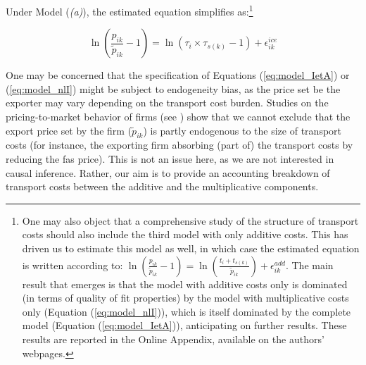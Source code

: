 \documentclass[a4paper,11pt]{article}
\begin{document}
Under Model (\textit{(a)}), the estimated equation simplifies as:\footnote{One may also object that a comprehensive study of the structure of transport costs should also include the third model with only additive costs. This has driven us to estimate this model as well, in which case the estimated equation is written according to: $\ln\left(\frac{p_{ik}}{\widetilde{p}_{ik}}-1 \right)= \ln \left(\frac{t_{i} + t_{s(k)}}{\widetilde{p}_{ik}}\right) + \epsilon^{add}_{ik}$. The main result that emerges is that the model with additive costs only is dominated (in terms of quality of fit properties) by the model with multiplicative costs only (Equation (\ref{eq:model_nlI})), which is itself dominated by the complete model (Equation (\ref{eq:model_IetA})), anticipating on further results. These results are reported in the Online Appendix, available on the authors' webpages.}

\begin{equation}
\ln\left(\frac{p_{ik}}{\widetilde{p}_{ik}}-1 \right)= \ln \left(\tau_{i}\times\tau_{s(k)}-1 \right) + \epsilon^{ice}_{ik} \label{eq:model_nlI}
\end{equation}

One may be concerned that the specification of Equations (\ref{eq:model_IetA}) or (\ref{eq:model_nlI}) might be subject to endogeneity bias, as the price set be the exporter may vary depending on the transport cost burden. Studies on the pricing-to-market behavior of firms (see \citealp{Krugman-87}) show that we cannot exclude that the export price set by the firm ($\widetilde{p}_{ik}$) is partly endogenous to the size of transport costs (for instance, the exporting firm absorbing (part of) the transport costs by reducing the fas price). This is not an issue here, as we are not interested in causal inference. Rather, our aim is to provide an accounting breakdown of transport costs between the additive and the multiplicative components. 

\end{document}
